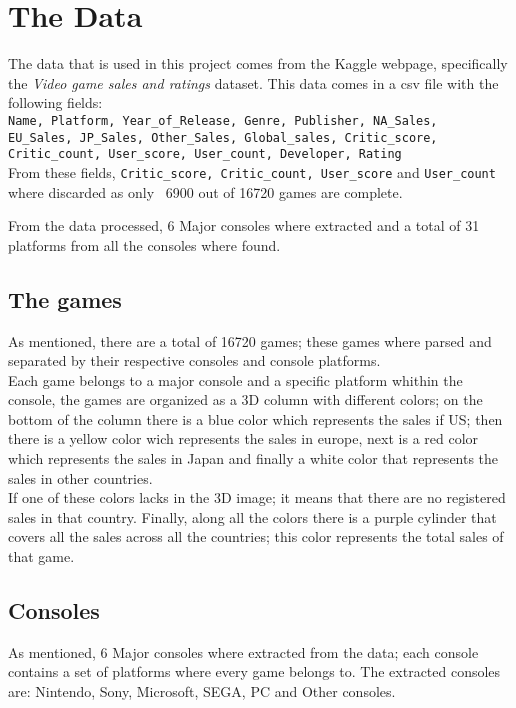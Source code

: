 \section{The Data}
The data that is used in this project comes from the Kaggle webpage,
specifically the \textit{Video game sales and ratings}
dataset\cite{KaggleDataset}. This data comes in a csv file with the following
fields:\\
\texttt{Name, Platform, Year\_of\_Release, Genre, Publisher, NA\_Sales, \\
  EU\_Sales, JP\_Sales, Other\_Sales, Global\_sales, Critic\_score,\\
  Critic\_count, User\_score, User\_count, Developer, Rating}\\

From these fields, \texttt{Critic\_score, Critic\_count, User\_score} and
\texttt{User\_count} where discarded as only ~6900 out of 16720 games are
complete.

From the data processed, 6 Major consoles where extracted and a total of 31
platforms from all the consoles where found.

\subsection{The games}
As mentioned, there are a total of 16720 games; these games where parsed and
separated by their respective consoles and console platforms.\\

Each game belongs to a major console and a specific platform whithin the
console, the games are organized as a 3D column with different colors;
on the bottom of the column there is a blue color which represents the sales
if US; then there is a yellow color wich represents the sales in europe, next
is a red color which represents the sales in Japan and finally a white color
that represents the sales in other countries.\\

If one of these colors lacks in the 3D image; it means that there are no
registered sales in that country. Finally, along all the colors there is a
purple cylinder that covers all the sales across all the countries; this
color represents the total sales of that game.\\

\subsection{Consoles}
As mentioned, 6 Major consoles where extracted from the data; each console
contains a set of platforms where every game belongs to.
The extracted consoles are: Nintendo, Sony, Microsoft, SEGA, PC and Other
consoles.\\

